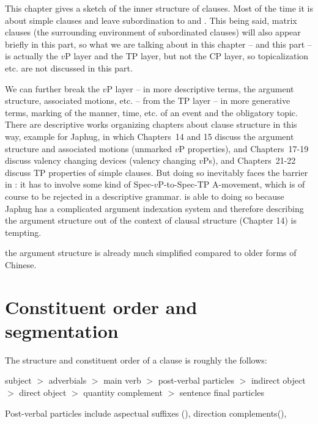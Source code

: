 \documentclass[../main.tex]{subfiles}
\begin{document}
This chapter gives a sketch of the inner structure of clauses.
Most of the time it is about simple clauses and leave subordination to 
 and .
This being said, matrix clauses (the surrounding environment of subordinated clauses)
will also appear briefly in this part, so what we are talking about in this chapter -- and this part -- is 
actually the $v$P layer and the TP layer, but not the CP layer, so topicalization etc. are not 
discussed in this part. 

We can further break the $v$P layer -- in more descriptive terms, the argument 
structure, associated motions, etc.
-- from the TP layer -- in more generative terms, marking of the manner, time, etc. of an event and the
obligatory topic. There are descriptive works organizing chapters about clause structure in this way, 
example \citet{jacques2021grammar} for Japhug, in which Chapters~14 and 15 discuss the argument structure 
and associated motions (unmarked $v$P properties), and Chapters~17-19 discuss valency changing devices 
(valency changing $v$Ps), and Chapters~21-22 discuss TP properties of simple clauses. 
But doing so inevitably faces the barrier in : 
it has to involve some kind of Spec-$v$P-to-Spec-TP A-movement, 
which is of course to be rejected in a descriptive grammar. 
\citet{jacques2021grammar} is able to doing so 
because Japhug has a complicated argument indexation system 
and therefore describing the argument structure out of the context of clausal structure (Chapter 14) is tempting.

the argument structure is already much simplified compared to older forms of Chinese.

\section{Constituent order and segmentation}\label{sec:clause-constituent-order-overview}

The structure and constituent order of a clause is roughly the follows:
\begin{exe}
    \ex\label{ex:clause-order} subject $>$ adverbials $>$ main verb $>$ post-verbal particles $>$ indirect object $>$ direct object $>$ quantity complement $>$ sentence final particles %
\end{exe}
Post-verbal particles include aspectual suffixes (),
direction complements(), %
\end{document}
